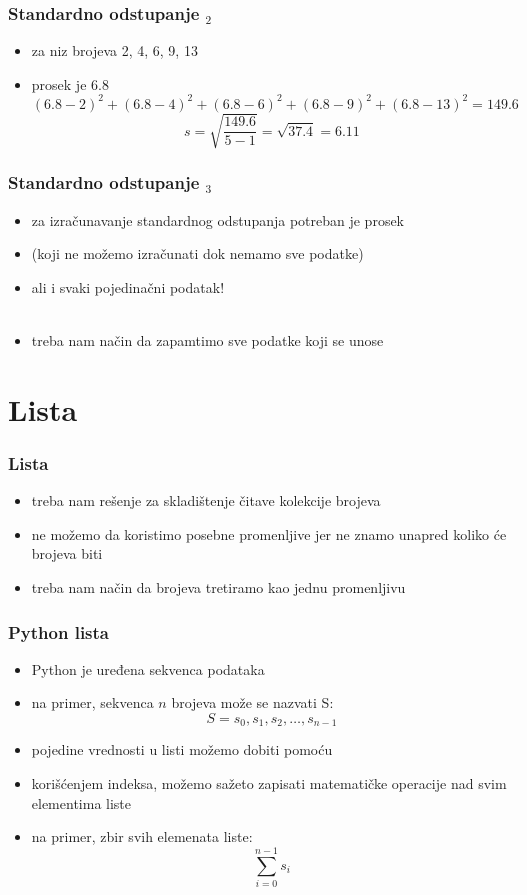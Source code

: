 \documentclass[utf8,compress,aspectratio=169]{beamer}
\begin{document}
\begin{frame}[fragile]
  \frametitle{Standardno odstupanje $_2$}
  \begin{itemize}
    \item za niz brojeva 2, 4, 6, 9, 13
    \item prosek je 6.8 \\
    $$(6.8-2)^2 + (6.8-4)^2 + (6.8-6)^2 + (6.8-9)^2 + (6.8-13)^2 = 149.6$$
    $$s = \sqrt{\frac{149.6}{5-1}} = \sqrt{37.4} = 6.11$$
  \end{itemize}
\end{frame}

\begin{frame}[fragile]
  \frametitle{Standardno odstupanje $_3$}
  \begin{itemize}
    \item za izračunavanje standardnog odstupanja potreban je prosek
    \item (koji ne možemo izračunati dok nemamo sve podatke)
    \item ali i svaki pojedinačni podatak! \\ \ \\
    \item treba nam način da zapamtimo sve podatke koji se unose
  \end{itemize}
\end{frame}

\section[Lista]{Lista}

\begin{frame}[fragile]
  \frametitle{Lista}
  \begin{itemize}
    \item treba nam rešenje za skladištenje čitave kolekcije brojeva
    \item ne možemo da koristimo posebne promenljive jer ne znamo unapred koliko će brojeva biti
    \item treba nam način da  brojeva tretiramo kao jednu promenljivu
  \end{itemize}
\end{frame}

\begin{frame}[fragile]
  \frametitle{Python lista}
  \begin{itemize}
    \item Python  je uređena sekvenca podataka
    \item na primer, sekvenca $n$ brojeva može se nazvati S: \\
    $$S = s_0, s_1, s_2, \ldots, s_{n-1}$$
    \item pojedine vrednosti u listi možemo dobiti pomoću 
    \item korišćenjem indeksa, možemo sažeto zapisati matematičke operacije nad svim elementima liste
    \item na primer, zbir svih elemenata liste: \\
    $$ \sum_{i=0}^{n-1}{s_i} $$
  \end{itemize}
\end{frame}
\end{document}
